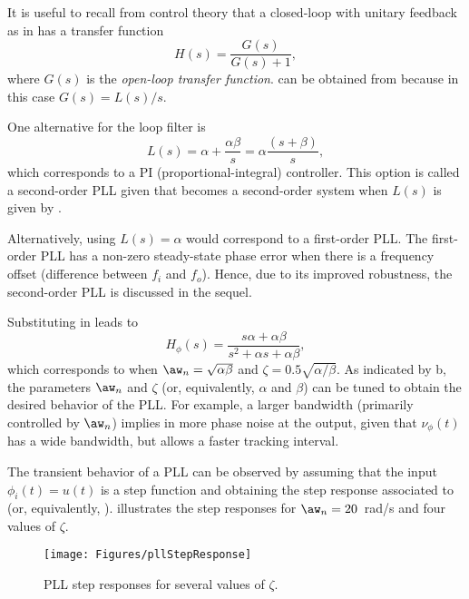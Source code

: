 It is useful to recall from control theory that a closed-loop with unitary feedback as
in  has a transfer function 
\begin{equation}
H(s)=\frac{G(s)}{G(s)+1}, 
\label{eq:feedbackControl}
\end{equation}
where $G(s)$ is the \emph{open-loop transfer function}.  can be obtained from  because in this case $G(s)=L(s)/s$.

One alternative for the loop filter is
\begin{equation}
L(s) = \alpha + \frac{\alpha \beta}{s} = \alpha \frac{(s + \beta)}{s},
\label{eq:pllSecondOrder}
\end{equation}
which corresponds to a PI (proportional-integral) controller. This option is called a second-order PLL given that  becomes a second-order system when $L(s)$ is given by .

Alternatively, using $L(s) = \alpha$ would correspond to a first-order PLL. The first-order PLL has a non-zero steady-state phase error when there is a frequency offset (difference between $f_i$ and $f_o$). Hence, due to its improved robustness, the second-order PLL is discussed in the sequel.

Substituting  in  leads to
\begin{equation}
H_{\phi}(s) = \frac{s \alpha + \alpha \beta}{s^2 + \alpha s + \alpha \beta},
\label{eq:pllSecondOrder2}
\end{equation}
which corresponds to  when $\aw_n = \sqrt{\alpha \beta}$ and $\zeta = 0.5 \sqrt{\alpha/\beta}$. As indicated by b, the parameters $\aw_n$ and $\zeta$ (or, equivalently, $\alpha$ and $\beta$) can be tuned to obtain the desired behavior of the PLL. For example, a larger bandwidth (primarily controlled by $\aw_n$) implies in more phase noise at the output, given that $\nu_{\phi}(t)$ has a wide bandwidth, but allows
a faster tracking interval.

The transient behavior of a PLL can be observed by assuming that the input $\phi_i(t)=u(t)$ is a step function and obtaining the step response associated to  (or, equivalently, ).  illustrates the step responses for $\aw_n = 20$~rad/s and four values of $\zeta$. 

\begin{figure}[htbp]
\centering
\texttt{[image: Figures/pllStepResponse]}
\caption{PLL step responses for several values of $\zeta$.\label{fig:pllStepResponse}}
\end{figure}


